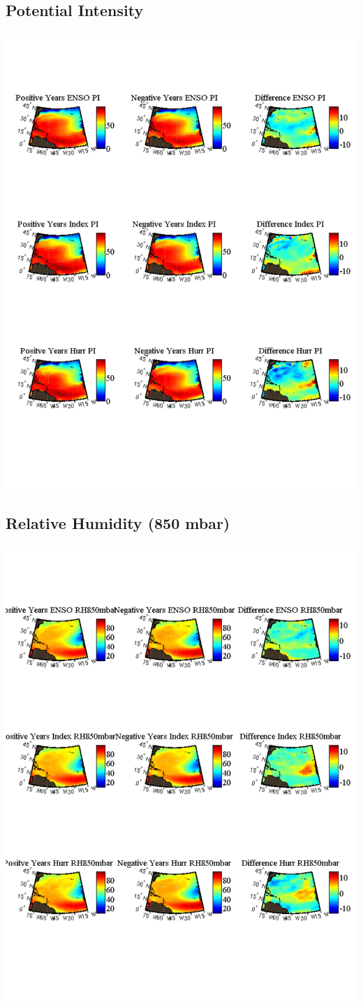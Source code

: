 \documentclass[11pt]{article}
\begin{document}
\subsection{Potential Intensity}
\includegraphics[scale=.75]{images/comparePIComposites.pdf}

\newpage
\subsection{Relative Humidity (850 mbar)}
\includegraphics[scale=.75]{images/compareRHComposites.pdf}
\end{document}
